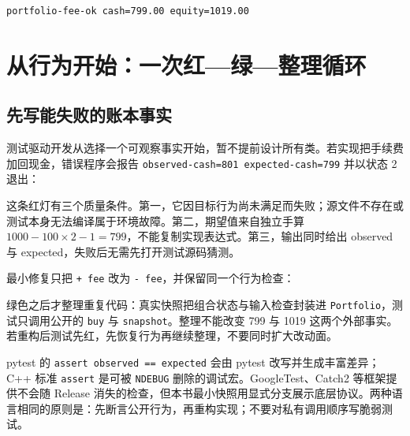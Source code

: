 \begin{lstlisting}[numbers=none]
portfolio-fee-ok cash=799.00 equity=1019.00
\end{lstlisting}

\section{从行为开始：一次红---绿---整理循环}

\subsection{先写能失败的账本事实}

测试驱动开发从选择一个可观察事实开始，暂不提前设计所有类。若实现把手续费加回现金，错误程序会报告 \texttt{observed-cash=801 expected-cash=799} 并以状态 2 退出：



这条红灯有三个质量条件。第一，它因目标行为尚未满足而失败；源文件不存在或测试本身无法编译属于环境故障。第二，期望值来自独立手算 \(1000-100\times2-1=799\)，不能复制实现表达式。第三，输出同时给出 observed 与 expected，失败后无需先打开测试源码猜测。

最小修复只把 \texttt{+ fee} 改为 \texttt{- fee}，并保留同一个行为检查：



绿色之后才整理重复代码：真实快照把组合状态与输入检查封装进 \texttt{Portfolio}，测试只调用公开的 \texttt{buy} 与 \texttt{snapshot}。整理不能改变 799 与 1019 这两个外部事实。若重构后测试先红，先恢复行为再继续整理，不要同时扩大改动面。

\begin{pythonbridge}
pytest 的 \texttt{assert observed == expected} 会由 pytest 改写并生成丰富差异；C++ 标准 \texttt{assert} 是可被 \texttt{NDEBUG} 删除的调试宏。GoogleTest、Catch2 等框架提供不会随 Release 消失的检查，但本书最小快照用显式分支展示底层协议。两种语言相同的原则是：先断言公开行为，再重构实现；不要对私有调用顺序写脆弱测试。

\end{pythonbridge}

